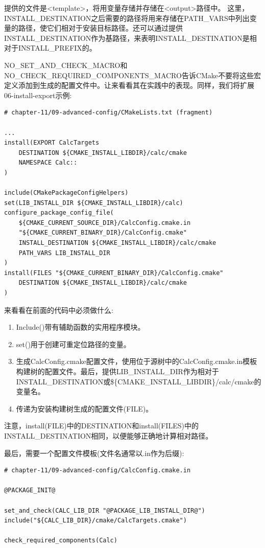 提供的文件是<template>，将用变量存储并存储在<output>路径中。 这里，INSTALL\_DESTINATION之后需要的路径将用来存储在PATH\_VARS中列出变量的路径，使它们相对于安装目标路径。还可以通过提供INSTALL\_DESTINATION作为基路径，来表明INSTALL\_DESTINATION是相对于INSTALL\_PREFIX的。

NO\_SET\_AND\_CHECK\_MACRO和NO\_CHECK\_REQUIRED\_COMPONENTS\_MACRO告诉CMake不要将这些宏定义添加到生成的配置文件中。让来看看其在实践中的表现。同样，我们将扩展06-install-export示例:

\begin{lstlisting}[style=styleCMake]
# chapter-11/09-advanced-config/CMakeLists.txt (fragment)

...
install(EXPORT CalcTargets
	DESTINATION ${CMAKE_INSTALL_LIBDIR}/calc/cmake
	NAMESPACE Calc::
)

include(CMakePackageConfigHelpers)
set(LIB_INSTALL_DIR ${CMAKE_INSTALL_LIBDIR}/calc)
configure_package_config_file(
	${CMAKE_CURRENT_SOURCE_DIR}/CalcConfig.cmake.in
	"${CMAKE_CURRENT_BINARY_DIR}/CalcConfig.cmake"
	INSTALL_DESTINATION ${CMAKE_INSTALL_LIBDIR}/calc/cmake
	PATH_VARS LIB_INSTALL_DIR
)
install(FILES "${CMAKE_CURRENT_BINARY_DIR}/CalcConfig.cmake"
	DESTINATION ${CMAKE_INSTALL_LIBDIR}/calc/cmake
)
\end{lstlisting}

来看看在前面的代码中必须做什么:

\begin{enumerate}
\item 
Include()带有辅助函数的实用程序模块。

\item 
set()用于创建可重定位路径的变量。

\item 
生成CalcConfig.cmake配置文件，使用位于源树中的CalcConfig.cmake.in模板构建树的配置文件。最后，提供LIB\_INSTALL\_DIR作为相对于INSTALL\_DESTINATION或\$\{CMAKE\_INSTALL\_LIBDIR\}/calc/cmake的变量名。

\item 
传递为安装构建树生成的配置文件(FILE)。
\end{enumerate}

注意，install(FILE)中的DESTINATION和install(FILES)中的INSTALL\_DESTINATION相同，以便能够正确地计算相对路径。

最后，需要一个配置文件模板(文件名通常以.in作为后缀):

\begin{lstlisting}[style=styleCMake]
# chapter-11/09-advanced-config/CalcConfig.cmake.in

@PACKAGE_INIT@

set_and_check(CALC_LIB_DIR "@PACKAGE_LIB_INSTALL_DIR@")
include("${CALC_LIB_DIR}/cmake/CalcTargets.cmake")

check_required_components(Calc)
\end{lstlisting}


